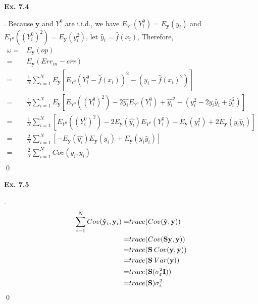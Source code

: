 \documentclass[12pt]{article}
\newenvironment{sol}
  {\par\vspace{3mm}\noindent{\it Solution}.}
  {\qed}
\begin{document}
\newpage
\begin{flushleft}
\textbf{Ex. 7.4}
\end{flushleft}
\begin{sol}
Because $\mathbf{y}$ and $Y^0$ are i.i.d., we have $E_{Y^0}(Y_i^0)=E_{\mathbf{y}}(y_i)$ and $E_{Y^0}((Y_i^0)^2)=E_{\mathbf{y}}(y_i^2)$, let $\hat{y}_i=\hat{f}(x_i)$, Therefore,
\begin{equation*}
\begin{split}
\omega=&E_{\mathbf{y}}(op)\\
=&E_{\mathbf{y}}(Err_{in}-\overline{err})\\
=&\frac{1}{N}\sum_{i=1}^NE_{\mathbf{y}}[E_{Y^0}(Y_i^0-\hat{f}(x_i))^2-(y_i-\hat{f}(x_i)^2)]\\
=&\frac{1}{N}\sum_{i=1}^NE_{\mathbf{y}}[E_{Y^0}((Y_i^0)^2)-2\hat{y_i}E_{Y^0}(Y_i^0)+\hat{y_i}^2-(y_i^2-2y_i\hat{y}_i+\hat{y}_i^2)]\\
=&\frac{1}{N}\sum_{i=1}^N[E_{Y^0}((Y_i^0)^2)-2E_{\mathbf{y}}(\hat{y_i})E_{Y^0}(Y_i^0)-E_{\mathbf{y}}(y_i^2)+2E_{\mathbf{y}}(y_i\hat{y}_i)]\\
=&\frac{2}{N}\sum_{i=1}^N[-E_{\mathbf{y}}(\hat{y_i})E_{\mathbf{y}}(y_i)+E_{\mathbf{y}}(y_i\hat{y}_i)]\\
=&\frac{2}{N}\sum_{i=1}^NCov(\hat{y}_i,y_i)\\
\end{split}
\end{equation*}
\end{sol}

\begin{flushleft}
\textbf{Ex. 7.5}
\end{flushleft}
\def \y {\mathbf{y}}
\def \s {\mathbf{S}}

\iffalse %
$$Cov(\hat{\y}_i,\y_i)=E[(\hat{y}_i-E\hat{y}_i)(y_i-Ey_i)]$$
because $\hat{y}=Sy$, so $\hat{y}_i=s_iy$, the $s_i$ is the row vector of $S$. So,
$$Cov(\hat{\y}_i,\y_i)=E[(\sum_{j=1}^Ns_{ij}y_j-E\sum_{j=1}^Ns_{ij}y_j)(y_i-Ey_i)]$$
$$=E[\sum_{j=1}^Ns_{ij}(y_j-Ey_j)(y_i-Ey_i)]$$
$$=\sum_{j=1}^Ns_{ij}Cov(y_j,y_i)$$
As $Cov(y_j,y_i)=0$ when $i \neq j$, so
$$Cov(\hat{y_i},y_i)=s_{ii}Cov(y_i,y_i)=s_{ii}Dy_{i}=s_{ii}\sigma_\varepsilon^2$$
so 
$$\sum_{i=1}^NCov(\hat{y_i},y_i)=\sum_{i=1}^Ns_{ii}\sigma_\varepsilon^2=trace(S)\sigma_\varepsilon^2$$
\fi %

\begin{sol}
\begin{equation*}
\begin{split}
\sum_{i=1}^NCov(\hat{\y}_i,\y_i)=&trace(Cov(\hat{\y},\y))\\
=&trace(Cov(\s\y,\y))\\
=&trace(\s \hspace{0.5ex} Cov(\y,\y))\\
=&trace(\s \hspace{0.5ex} Var(\y))\\
=&trace(\s(\sigma_\varepsilon^2\mathbf{I}))\\
=&trace(\s)\sigma_\varepsilon^2\\
\end{split}
\end{equation*}
\end{sol}
\end{document}
